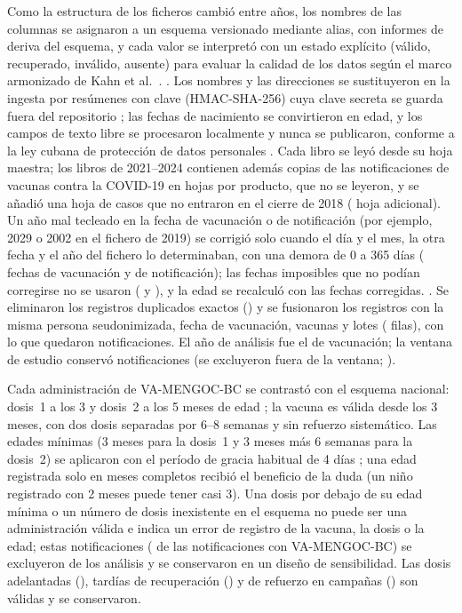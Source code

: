 \documentclass[11pt]{article}
\begin{document}
Como la estructura de los ficheros cambió entre años, los nombres de las columnas se asignaron a un
esquema versionado mediante alias, con informes de deriva del esquema, y cada valor se interpretó con
un estado explícito (válido, recuperado, inválido, ausente) para evaluar la calidad de los datos
según el marco armonizado de Kahn et al.\ \cite{Kahn2016}. \VFormSentence. Los nombres y las direcciones se
sustituyeron en la ingesta por resúmenes con clave (HMAC-SHA-256) cuya clave secreta se guarda fuera
del repositorio \cite{ENISA2019}; las fechas de nacimiento se convirtieron en edad, y los campos de
texto libre se procesaron localmente y nunca se publicaron, conforme a la ley cubana de protección
de datos personales \cite{Ley149}. Cada libro se leyó desde su hoja maestra; los libros de
2021--2024 contienen además copias de las notificaciones de vacunas contra la COVID-19 en hojas por
producto, que no se leyeron, y se añadió una hoja de casos que no entraron en el cierre de 2018
(\VNExtraSheets{} hoja adicional). Un año mal tecleado en la fecha de vacunación o de notificación
(por ejemplo, 2029 o 2002 en el fichero de 2019) se corrigió solo cuando el día y el mes, la otra
fecha y el año del fichero lo determinaban, con una demora de 0 a 365 días (\VVaccYearImputed{}
fechas de vacunación y \VNotifYearImputed{} de notificación); las fechas imposibles que no podían
corregirse no se usaron (\VVaccYearDropped{} y \VNotifYearDropped), y la edad se recalculó con las
fechas corregidas. \VPartialYearsSentence. Se eliminaron los registros duplicados exactos
(\VExactDuplicates) y se fusionaron los registros con la misma persona seudonimizada, fecha de
vacunación, vacunas y lotes (\VKeyDuplicatesMerged{} filas), con lo que quedaron \VReportsDedup{}
notificaciones. El año de análisis fue el de vacunación; la ventana de estudio conservó
\VReportsInWindow{} notificaciones (se excluyeron \VReportsOutsideWindow{} fuera de la ventana;
).

Cada administración de VA-MENGOC-BC se contrastó con el esquema nacional: dosis~1 a los 3 y
dosis~2 a los 5 meses de edad \cite{SierraGonzalez2019}; la vacuna es válida desde los 3 meses, con
dos dosis separadas por 6--8 semanas y sin refuerzo sistemático. Las edades mínimas (3 meses para la
dosis~1 y 3 meses más 6 semanas para la dosis~2) se aplicaron con el período de gracia habitual de 4
días \cite{Kroger2023}; una edad registrada solo en meses completos recibió el beneficio de la duda
(un niño registrado con 2 meses puede tener casi 3). Una dosis por debajo de su edad mínima o un
número de dosis inexistente en el esquema no puede ser una administración válida e indica un error
de registro de la vacuna, la dosis o la edad; estas \PONScheduleInvalid{} notificaciones
(\POPctScheduleInvalid{} de las notificaciones con VA-MENGOC-BC) se excluyeron de los análisis y se
conservaron en un diseño de sensibilidad. Las dosis adelantadas (\PONScheduleEarly), tardías de
recuperación (\PONScheduleLate) y de refuerzo en campañas (\PONScheduleBooster) son válidas y se
conservaron.
\end{document}
